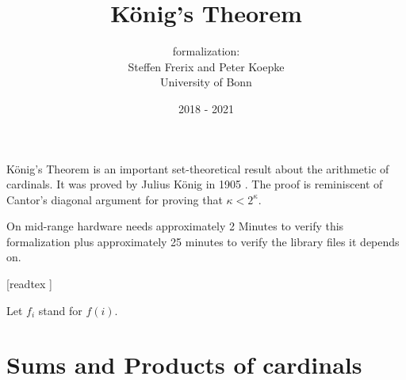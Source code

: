 \documentclass{article}
\title{König's Theorem}
\author{\Naproche formalization: \vspace{0.5em} \\
Steffen Frerix and Peter Koepke \\
University of Bonn}
\date{2018 - 2021}
\begin{document}
\maketitle

\noindent König's Theorem is an important set-theoretical result about the
arithmetic of cardinals.
It was proved by Julius König in 1905 \cite[p. 177--180]{Koenig1905}.
The proof is reminiscent of Cantor's diagonal argument for proving that
$\kappa \less 2^\kappa$.

On mid-range hardware \Naproche needs approximately 2 Minutes to verify this
formalization plus approximately 25 minutes to verify the library files it
depends on.

\begin{forthel}

  [readtex ]


  Let $f_{i}$ stand for $f(i)$.
\end{forthel}


\section*{Sums and Products of cardinals}
\end{document}
